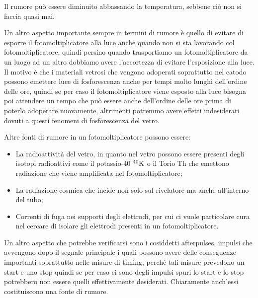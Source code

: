 Il rumore può essere diminuito abbassando la temperatura, sebbene ciò non si faccia quasi mai. 

Un altro aspetto importante sempre in termini di rumore è quello di evitare di esporre il fotomoltiplicatore alla luce anche quando non si sta lavorando col fotomoltiplicatore, quindi persino quando trasportiamo un fotomoltiplicatore da un luogo ad un altro dobbiamo avere l'accortezza di evitare l'esposizione alla luce. Il motivo è che i materiali vetrosi che vengono adoperati soprattutto nel catodo possono emettere luce di fosforescenza anche per tempi molto lunghi dell'ordine delle ore, quindi se per caso il fotomoltiplicatore viene esposto alla luce bisogna poi attendere un tempo che può essere anche dell'ordine delle ore prima di poterlo adoperare nuovamente, altrimenti potremmo avere effetti indesiderati dovuti a questi fenomeni di fosforescenza del vetro. 

Altre fonti di rumore in un fotomoltiplicatore possono essere:

\begin{itemize}[leftmargin=0.5cm]
   \item La radioattività del vetro, in quanto nel vetro possono essere presenti degli isotopi radioattivi come il potassio-40 $\rm ^{40}K$ o il Torio Th che emettono radiazione che viene amplificata nel fotomoltiplicatore;
   \item La radiazione cosmica che incide non solo sul rivelatore ma anche all'interno del tubo;
   \item Correnti di fuga nei supporti degli elettrodi, per cui ci vuole particolare cura nel cercare di isolare gli elettrodi presenti in un fotomoltiplicatore.
\end{itemize}

Un altro aspetto che potrebbe verificarsi sono i cosiddetti afterpulses, impulsi che avvengono dopo il segnale principale i quali possono avere delle conseguenze importanti soprattutto nelle misure di timing, perché tali misure prevedono un start e uno stop quindi se per caso ci sono degli impulsi spuri lo start e lo stop potrebbero non essere quelli effettivamente desiderati. Chiaramente anch'essi costituiscono una fonte di rumore.

